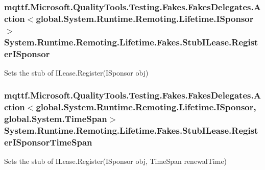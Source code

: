 \hypertarget{class_system_1_1_runtime_1_1_remoting_1_1_lifetime_1_1_fakes_1_1_stub_i_lease_a7530589491be1ffbf44d8e19ab8fada5}{
\subsubsection[{Register\-I\-Sponsor}]{\setlength{\rightskip}{0pt plus 5cm}mqttf.\-Microsoft.\-Quality\-Tools.\-Testing.\-Fakes.\-Fakes\-Delegates.\-Action$<$global.\-System.\-Runtime.\-Remoting.\-Lifetime.\-I\-Sponsor$>$ System.\-Runtime.\-Remoting.\-Lifetime.\-Fakes.\-Stub\-I\-Lease.\-Register\-I\-Sponsor}}\label{class_system_1_1_runtime_1_1_remoting_1_1_lifetime_1_1_fakes_1_1_stub_i_lease_a7530589491be1ffbf44d8e19ab8fada5}


Sets the stub of I\-Lease.\-Register(\-I\-Sponsor obj)

\hypertarget{class_system_1_1_runtime_1_1_remoting_1_1_lifetime_1_1_fakes_1_1_stub_i_lease_a0a5841ad06322d231fbcbfae38bc6556}{
\subsubsection[{Register\-I\-Sponsor\-Time\-Span}]{\setlength{\rightskip}{0pt plus 5cm}mqttf.\-Microsoft.\-Quality\-Tools.\-Testing.\-Fakes.\-Fakes\-Delegates.\-Action$<$global.\-System.\-Runtime.\-Remoting.\-Lifetime.\-I\-Sponsor, global.\-System.\-Time\-Span$>$ System.\-Runtime.\-Remoting.\-Lifetime.\-Fakes.\-Stub\-I\-Lease.\-Register\-I\-Sponsor\-Time\-Span}}\label{class_system_1_1_runtime_1_1_remoting_1_1_lifetime_1_1_fakes_1_1_stub_i_lease_a0a5841ad06322d231fbcbfae38bc6556}


Sets the stub of I\-Lease.\-Register(\-I\-Sponsor obj, Time\-Span renewal\-Time)

